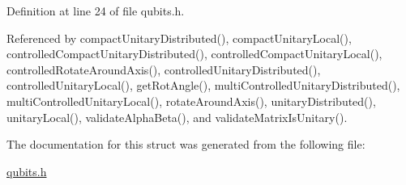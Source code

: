Definition at line 24 of file qubits.h.

Referenced by compactUnitaryDistributed(), compactUnitaryLocal(), controlledCompactUnitaryDistributed(), controlledCompactUnitaryLocal(), controlledRotateAroundAxis(), controlledUnitaryDistributed(), controlledUnitaryLocal(), getRotAngle(), multiControlledUnitaryDistributed(), multiControlledUnitaryLocal(), rotateAroundAxis(), unitaryDistributed(), unitaryLocal(), validateAlphaBeta(), and validateMatrixIsUnitary().

The documentation for this struct was generated from the following file:\begin{DoxyCompactItemize}
\item 
\hyperlink{qubits_8h}{qubits.h}\end{DoxyCompactItemize}
